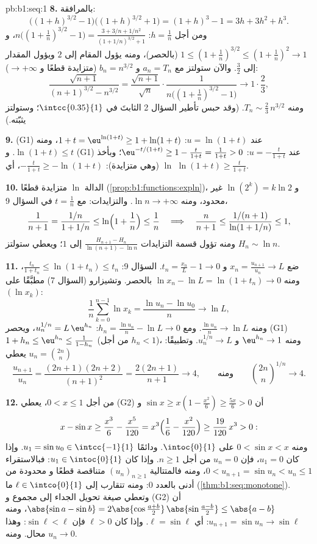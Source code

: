 \begin{solution}{pb:b1:seq:1}
\textbf{8.} بالمرافقة:
\[
\bigl((1+h)^{3/2} - 1\bigr)\bigl((1+h)^{3/2} + 1\bigr)
= (1+h)^3 - 1 = 3h + 3h^2 + h^3 .
\]
ومن أجل $h = \frac1n$: $n\bigl((1 + \frac1n)^{3/2} - 1\bigr) =
\frac{3 + 3/n + 1/n^2}{(1 + 1/n)^{3/2} + 1}$، و $1 \leq (1 +
\frac1n)^{3/2} \leq (1 + \frac1n)^2 \to 1$ (بالحصر)، ومنه يؤول
المقام إلى $2$ ويؤول المقدار إلى $\frac32$. والآن
ستولتز مع $a_n = T_n$ و $b_n = n^{3/2}$ (متزايدة قطعًا و
$\to +\infty$):
\[
\frac{\sqrt{n+1}}{(n+1)^{3/2} - n^{3/2}}
= \frac{\sqrt{n+1}}{\sqrt n} \cdot
\frac{1}{n\bigl((1 + \frac1n)^{3/2} - 1\bigr)}
\longrightarrow 1 \cdot \frac{2}{3},
\]
ومنه $T_n \sim \frac23\,n^{3/2}$. (وقد حبس تأطير السؤال 2
الثابتَ في $\intcc{0.35}{1}$؛ وستولتز يثبّته.)

\textbf{9.} (G1) عند $u = \ln(1+t)$: $1 + t = \eu^{\ln(1+t)} \geq
1 + \ln(1+t)$، ومنه $\ln(1+t) \leq t$. و (G1) عند $u =
-\frac{t}{1+t}$: $\eu^{-t/(1+t)} \geq 1 - \frac{t}{1+t} =
\frac{1}{1+t} > 0$؛ وبأخذ $\ln$ (وهي متزايدة):
$-\frac{t}{1+t} \geq -\ln(1+t)$، أي $\ln(1+t) \geq
\frac{t}{1+t}$.

\textbf{10.} الدالة $\ln$ متزايدة قطعًا
(\cref{prop:b1:functions:expln})، و $\ln(2^k) = k\ln 2$ غير
محدود، ومنه $\ln n \to +\infty$. والتزايدات: مع $t =
\frac1n$ في السؤال 9،
\[
\frac 1{n+1} = \frac{1/n}{1 + 1/n} \leq
\ln\Bigl(1 + \frac1n\Bigr) \leq \frac1n
\quad\Longrightarrow\quad
\frac{n}{n+1} \leq \frac{1/(n+1)}{\ln(1 + 1/n)} \leq 1 ,
\]
ومنه تؤول قسمة التزايدات $\frac{H_{n+1} - H_n}{\ln(n+1) - \ln
n}$ إلى $1$؛ ويعطي ستولتز $H_n \sim \ln n$.

\textbf{11.} ضع $x_n = \frac{u_{n+1}}{u_n} \to L$ و $t_n =
\frac{x_n}{L} - 1 \to 0$. السؤال 9: $\frac{t_n}{1 + t_n} \leq
\ln(1 + t_n) \leq t_n$، ومنه $\ln x_n - \ln L = \ln(1 + t_n) \to
0$ بالحصر. وتشيزارو (السؤال 7) مطبَّقًا على $(\ln x_k)$:
\[
\frac1n \sum_{k=0}^{n-1} \ln x_k = \frac{\ln u_n - \ln u_0}{n}
\longrightarrow \ln L ,
\]
ومنه $\frac{\ln u_n}{n} \to \ln L$. ومع $h_n = \frac{\ln u_n}{n}
- \ln L \to 0$: $u_n^{1/n} = L\,\eu^{h_n}$، ويحصر (G1)
$1 + h_n \leq \eu^{h_n} \leq \frac{1}{1 - h_n}$ (من أجل $h_n < 1$)،
ومنه $\eu^{h_n} \to 1$ و $u_n^{1/n} \to L$. وتطبيقًا: $u_n =
\binom{2n}{n}$ يعطي
\[
\frac{u_{n+1}}{u_n} = \frac{(2n+1)(2n+2)}{(n+1)^2}
= \frac{2(2n+1)}{n+1} \longrightarrow 4 ,
\qquad\text{ومنه}\qquad
\binom{2n}{n}^{1/n} \to 4 .
\]

\textbf{12.} من أجل $0 < x \leq 1$، يعطي (G2) أن $\sin x \geq x(1 -
\frac{x^2}{6}) \geq \frac{5x}{6} > 0$ و
\[
x - \sin x \geq \frac{x^3}{6} - \frac{x^5}{120}
= x^3\Bigl(\frac16 - \frac{x^2}{120}\Bigr)
\geq \frac{19}{120}\,x^3 > 0 :
\]
ومنه $0 < \sin x < x$ على $\intoc{0}{1}$. ودائمًا $u_1 = \sin u_0
\in \intcc{-1}{1}$. وإذا كان $u_1 = 0$، فإن $u_n = 0$ من أجل $n \geq 1$.
وإذا كان $u_1 \in \intoc{0}{1}$: فبالاستقراء $0 < u_{n+1} = \sin u_n
< u_n \leq 1$، ومنه فالمتتالية $(u_n)_{n\geq1}$ متناقصة قطعًا و
محدودة من أدنى بالعدد $0$: ومنه تتقارب إلى $\ell \in
\intco{0}{1}$ ما (\cref{thm:b1:seq:monotone}). وتعطي صيغة تحويل الجداء
إلى مجموع و (G2) أن $\abs{\sin a - \sin b} = 2\abs{\cos
\frac{a+b}{2}}\,\abs{\sin\frac{a-b}{2}} \leq \abs{a - b}$، ومنه
$u_{n+1} = \sin u_n \to \sin \ell$: أي $\ell = \sin\ell$. وإذا كان $\ell
> 0$ فإن $\sin\ell < \ell$: وهذا محال. ومنه $u_n \to 0$.


\end{solution}
